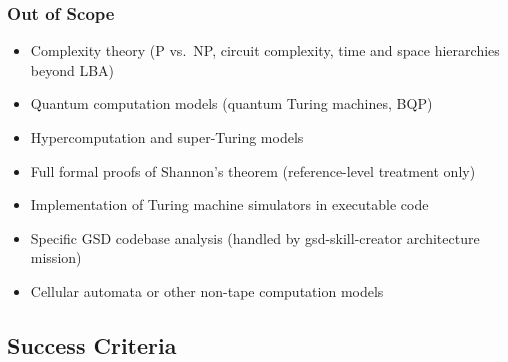 \documentclass[11pt,letterpaper]{article}
\begin{document}
\subsubsection{Out of Scope}
\begin{itemize}
  \item Complexity theory (P vs.\ NP, circuit complexity, time and space hierarchies beyond LBA)
  \item Quantum computation models (quantum Turing machines, BQP)
  \item Hypercomputation and super-Turing models
  \item Full formal proofs of Shannon's theorem (reference-level treatment only)
  \item Implementation of Turing machine simulators in executable code
  \item Specific GSD codebase analysis (handled by gsd-skill-creator architecture mission)
  \item Cellular automata or other non-tape computation models
\end{itemize}

\subsection{Success Criteria}
\end{document}
